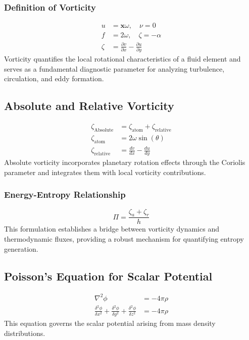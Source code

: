 \documentclass[12pt]{article}
\begin{document}
    \subsubsection*{Definition of Vorticity}
    \begin{align}
        u &= \boldsymbol{x} \omega, \quad \nu=0 \\
        f &= 2 \omega, \quad \zeta=-\alpha \\
        \zeta &= \frac{\partial v}{\partial x} - \frac{\partial u}{\partial y}
    \end{align}
    Vorticity quantifies the local rotational characteristics of a fluid element and serves as a fundamental diagnostic parameter for analyzing turbulence, circulation, and eddy formation.

    \subsection{Absolute and Relative Vorticity}
    \begin{align}
        \zeta_\text{Absolute} &= \zeta_\text{atom} + \zeta_\text{relative} \\
        \zeta_\text{atom} &= 2 \omega \sin(\theta) \\
        \zeta_{\text {relative }} &=\frac{d v}{d x}-\frac{d u}{d y}
    \end{align}
    Absolute vorticity incorporates planetary rotation effects through the Coriolis parameter and integrates them with local vorticity contributions.

    \subsubsection*{Energy-Entropy Relationship}
    \begin{equation*}
        \Pi = \frac{\zeta_a + \zeta_r}{h}
    \end{equation*}
    This formulation establishes a bridge between vorticity dynamics and thermodynamic fluxes, providing a robust mechanism for quantifying entropy generation.

    \subsection{Poisson's Equation for Scalar Potential}
    \begin{align}
        \nabla^2 \phi &= -4 \pi \rho \\
        \frac{\delta^2 \phi}{\delta x^2}+\frac{\delta^2 \phi}{\delta y^2}+\frac{\delta^2 \phi}{\delta z^2} &= -4 \pi \rho
    \end{align}
    This equation governs the scalar potential arising from mass density distributions.
\end{document}
